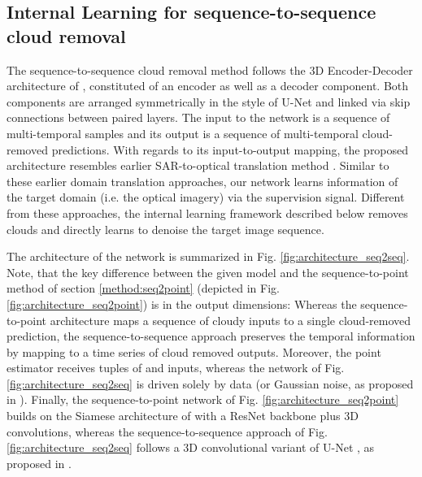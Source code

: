 \documentclass[journal]{IEEEtran}
\begin{document}
\subsection{Internal Learning for sequence-to-sequence cloud removal} \label{subsec:seq2se2method}

The sequence-to-sequence cloud removal method \cite{ebel2021seq2seq} follows the 3D Encoder-Decoder architecture of \cite{zhang2019internal}, constituted of an encoder as well as a decoder component. Both components are arranged symmetrically in the style of U-Net \cite{ronneberger2015u} and linked via skip connections between paired layers. The input to the network is a sequence of multi-temporal  samples and its output is a sequence of multi-temporal cloud-removed  predictions. With regards to its input-to-output mapping, the proposed architecture resembles earlier SAR-to-optical translation method  \cite{Fuentes_Reyes_Auer_Merkle_Henry_Schmitt_2019, wang2019sar}. Similar to these earlier domain translation approaches, our network learns information of the target domain (i.e. the optical imagery) via the supervision signal. Different from these approaches, the internal learning framework described below removes clouds and directly learns to denoise the target image sequence.

The architecture of the network is summarized in Fig. \ref{fig:architecture_seq2seq}. Note, that the key difference between the given model and the sequence-to-point method of section \ref{method:seq2point} (depicted in Fig. \ref{fig:architecture_seq2point}) is in the output dimensions: Whereas the sequence-to-point architecture maps a sequence of  cloudy inputs to a single cloud-removed prediction, the sequence-to-sequence approach preserves the temporal information by mapping to a time series of  cloud removed outputs. Moreover, the point estimator receives tuples of  and  inputs, whereas the network of Fig. \ref{fig:architecture_seq2seq} is driven solely by  data (or Gaussian noise, as proposed in \cite{ulyanov2018deep, zhang2019internal}). Finally, the sequence-to-point network of Fig. \ref{fig:architecture_seq2point} builds on the Siamese architecture of \cite{Sarukkai_Jain_Uzkent_Ermon_2019} with a ResNet backbone \cite{meraner2020cloud} plus 3D convolutions, whereas the sequence-to-sequence approach of Fig. \ref{fig:architecture_seq2seq} follows a 3D convolutional variant of U-Net \cite{ronneberger2015u}, as proposed in \cite{zhang2019internal}.
\end{document}

